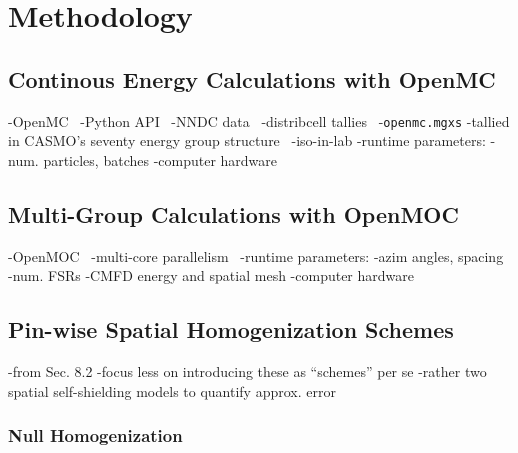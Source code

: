 \section{Methodology}
\label{sec:methodology}

\subsection{Continous Energy Calculations with OpenMC}
\label{subsec:openmc}

-OpenMC~\cite{romano2013openmc}
-Python API~\cite{boyd2016bigdata}
-NNDC data~\cite{nndc2016endf}
-distribcell tallies~\cite{lax2014distribcell}
-\texttt{openmc.mgxs}
  -tallied in CASMO's seventy energy group structure~\cite{rhodes2006casmo}
-iso-in-lab
-runtime parameters:
  -num. particles, batches
  -computer hardware

\subsection{Multi-Group Calculations with OpenMOC}
\label{subsec:openmoc}

-OpenMOC~\cite{boyd2014openmoc}
-multi-core parallelism~\cite{boyd2016parallel}
-runtime parameters:
  -azim angles, spacing
  -num. FSRs
  -CMFD energy and spatial mesh
  -computer hardware


\subsection{Pin-wise Spatial Homogenization Schemes}
\label{subsec:homogenize}

-from Sec. 8.2
-focus less on introducing these as ``schemes'' per se
  -rather two spatial self-shielding models to quantify approx. error

\subsubsection{Null Homogenization}
\label{subsubsec:homogenize-null}

